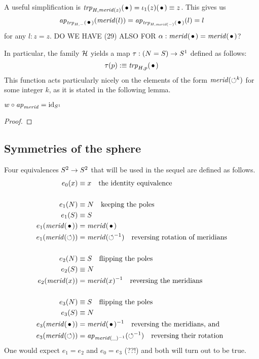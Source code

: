 \documentclass[english,a4]{article}
\begin{document}
A useful simplification is $\trp{H,\mrd(z)}(\base)=\iota_1(z)(\base)\jdeq z$.
This gives us 
\begin{equation}\label{eq:trp-Hmrd)}
\ap{\trp{H,-}(\base)}(\mrd(l)) = \ap{\trp{H,\mrd(\blank)}(\base)}(l) = l
\end{equation}
for any $l:z=z$. DO WE HAVE (29) ALSO FOR $\alpha:\mrd(\base)=\mrd(\base)$?

In particular, the family $\mathcal H$ yields a map
$\tau : (N=S) \to {S^1}$ defined as follows:
\begin{equation}
  \label{eq:15}
  \tau(p) \defequi \trp{H,p}(\base)  
\end{equation}
This function acts particularly nicely on the elements of the form
$\mathit{merid}(\mathord{\circlearrowleft}^k)$ for some integer $k$, as it is stated in the following
lemma.
\begin{lemma}
  $w\circ \mathop{{\it ap}_{\mathit{merid}}} = \mathord{\mathrm{id}}_{S^1}$ 
\end{lemma}
\begin{proof}
 {}  
\end{proof}

\subsection{Symmetries of the sphere}
\label{sec:symmetries-sphere}

Four equivalences $S^2\to S^2$ that will be used in the sequel are
defined as follows. 
\begin{align}
  \label{eq:S2symmetries}
  e_0(x)&\jdeq x \quad\text{the identity equivalence}\\
\nonumber\\
  e_1(N)&\jdeq N \quad\text{keeping the poles}\\
  e_1(S)&\jdeq S\\
  e_1(\mrd(\base))&= \mrd(\base)\\
  e_1(\mrd(\Sloop))&= \mrd(\Sloop^{-1})\quad\text{reversing rotation of meridians}\\
\nonumber\\
  e_2(N)&\jdeq S \quad\text{flipping the poles}\\
  e_2(S)&\jdeq N\\
  e_2(\mrd(x))&= \mrd(x)^{-1}\quad\text{reversing the meridians}\\
\nonumber\\
  e_3(N)&\jdeq S \quad\text{flipping the poles}\\
  e_3(S)&\jdeq N\\
  e_3(\mrd(\base))&= \mrd(\base)^{-1}\quad\text{reversing the meridians, and}\\
  e_3(\mrd(\Sloop))&= \ap{\mrd(\_)^{-1}}(\Sloop^{-1})\quad\text{reversing their rotation}
\end{align}
One would expect $e_1=e_2$ and $e_0=e_3$ (??!) and both will turn out to be true.
\end{document}
